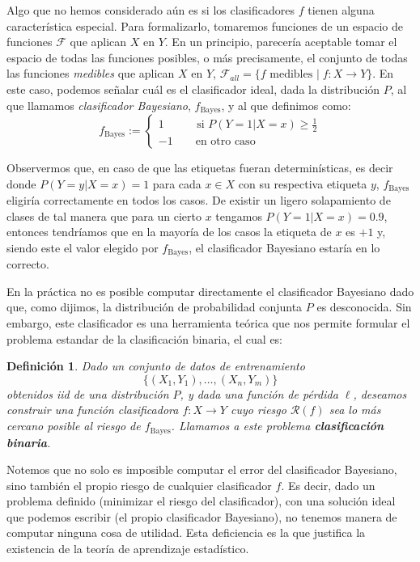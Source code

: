 \documentclass{report}
\newtheorem{dfn}{Definición}[subsection]
\begin{document}
Algo que no hemos considerado aún es si los clasificadores $f$ tienen alguna característica especial. Para formalizarlo, tomaremos funciones de un
espacio de funciones $\mathcal{F}$ que aplican $X$ en $Y$. En un principio, parecería aceptable tomar el espacio de todas las funciones posibles, o 
más precisamente, el conjunto de todas las funciones \textit{medibles} que aplican $X$ en $Y$, $\mathcal{F}_{all} = \{f \text{ medibles  } | 
\; f: X \rightarrow Y \}$. En este caso, podemos señalar cuál es el clasificador ideal, dada la distribución $P$, al que llamamos
\textit{clasificador Bayesiano}, $f_{\text{Bayes}}$, y al que definimos como:
\[
f_{\text{Bayes}} := \begin{cases}
1 \qquad \; \; \text{  si } P(Y=1 | X=x) \geq \frac{1}{2}\\
-1 \qquad \text{en otro caso }
\end{cases}
\]

Observermos que, en caso de que las etiquetas fueran determinísticas, es decir donde $P(Y=y|X=x)=1$ para cada $x\in X$ con su
respectiva etiqueta $y$, $f_{\text{Bayes}}$ eligiría correctamente en todos los casos. De existir un ligero solapamiento de clases 
de tal manera que para un cierto $x$ tengamos $P(Y=1|X=x) = 0.9$, entonces tendríamos
que en la mayoría de los casos la etiqueta de $x$ es $+1$ y, siendo este el valor elegido por $f_{\text{Bayes}}$, el clasificador
Bayesiano estaría en lo correcto.

En la práctica no es posible computar directamente el clasificador Bayesiano dado que, como dijimos, la distribución de probabilidad
conjunta $P$ es desconocida. Sin embargo, este clasificador es una herramienta teórica que nos permite formular el problema
estandar de la clasificación binaria, el cual es:\newline

\begin{dfn}
Dado un conjunto de datos de entrenamiento 
$$ \{ (X_1,Y_1), \dots ,(X_n, Y_m)\}$$ 
obtenidos iid de una distribución $P$, y dada una función de pérdida $\ell$, deseamos construir una función clasificadora 
$f:X\rightarrow Y$ cuyo riesgo $\mathcal{R}(f)$ sea lo más cercano posible al riesgo de $f_{\text{Bayes}}$. Llamamos a este problema
\textbf{clasificación binaria}.
\end{dfn}

Notemos que no solo es imposible computar el error del clasificador Bayesiano, sino también el propio riesgo de cualquier clasificador
$f$. Es decir, dado un problema definido (minimizar el riesgo del clasificador), con una solución ideal que podemos escribir (el propio
clasificador Bayesiano), no tenemos manera de computar ninguna cosa de utilidad. Esta deficiencia es la que justifica la existencia de 
 la teoría de aprendizaje estadístico.\newline
\end{document}

